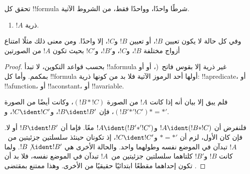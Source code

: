 \documentclass[../../../include/open-logic-section]{subfiles}
\begin{document}
\begin{prop}
تحقق كل !!{formula} شرطًا واحدًا، وواحدًا فقط، من الشروط الآتية.
\begin{enumerate}
\item $!A$ ذرية.







\end{enumerate}
وفي كل حالة لا يكون تعيين $!B$، أو تعيين $!B$ و$!C$، إلا واحدًا.
ومن معنى ذلك مثلًا امتناع أزواج مختلفة $!B$، و$!C$، و$!B'$،
و$!C'$ بحيث تكون $!A$ من الصورتين
\end{prop}

\begin{proof}
بحسب قواعد التكوين، لا تبدأ !!a{formula} غير ذرية إلا بقوس
فاتح~(، أو  أو بمكمم. وأما
كل !!{formula} أولها أحد الرموز الآتية فلا بد من كونها ذرية:
!!a{predicate}، أو !!a{function}، أو !!a{constant}، أو
!!a{variable}.

فلم يبق إلا بيان أنه إذا كانت $!A$ من
الصورة $(!B \ast !C)$، وكانت أيضًا من الصورة $(!B'
\mathbin{\ast'} !C')$، فإن $!B \ident !B'$، و$!C \ident !C'$،
و$\ast = {\ast'}$.

فلنفرض أن $!A \ident (!B \ast !C)$ و$!A \ident (!B'
\mathbin{\ast'} !C')$ معًا. فإما أن $!B \ident !B'$ أو لا.
فإن كان الأول، لزم أن $\ast = {\ast'}$ و$!C \ident !C'$،
إذ تكونان حينئذ سلسلتين جزئيتين من~$!A$ تبدآن في الموضع نفسه
وطولهما واحد. والحالة الأخرى هي $!B \not\ident !B'$. ولما كانت
$!B$ و$!B'$ كلتاهما سلسلتين جزئيتين من~$!A$ تبدآن في الموضع نفسه،
فلا بد أن تكون إحداهما مقطعًا ابتدائيًا حقيقيًا من الأخرى. وهذا
ممتنع بمقتضى .
\end{proof}
\end{document}
